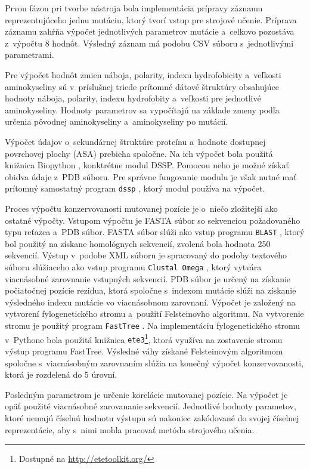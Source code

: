Prvou fázou pri tvorbe nástroja bola implementácia prípravy záznamu reprezentujúceho jednu mutáciu, ktorý tvorí vstup pre strojové učenie. Príprava záznamu zahŕňa výpočet jednotlivých parametrov mutácie a~celkovo pozostáva z~výpočtu 8 hodnôt. Výsledný záznam má podobu CSV súboru s~jednotlivými parametrami.

Pre výpočet hodnôt zmien náboja, polarity, indexu hydrofobicity a~veľkosti aminokyseliny sú v~príslušnej triede prítomné dátové štruktúry obsahujúce hodnoty náboja, polarity, indexu hydrofobity a~veľkosti pre jednotlivé aminokyseliny. Hodnoty parametrov sa vypočítajú na základe zmeny podľa určenia pôvodnej aminokyseliny a~aminokyseliny po mutácií.

Výpočet údajov o~sekundárnej štruktúre proteínu a~hodnote dostupnej povrchovej plochy (ASA) prebieha spoločne. Na ich výpočet bola použitá knižnica Biopython \cite{biopython}, konktrétne modul DSSP. Pomocou neho je možné získať obidva údaje z~PDB súboru. Pre správne fungovanie modulu je však nutné mať prítomný samostatný program {\tt dssp} , ktorý modul používa na výpočet.

Proces výpočtu konzervovanosti mutovanej pozície je o~niečo zložitejší ako ostatné výpočty. Vstupom výpočtu je FASTA súbor so sekvenciou požadovaného typu reťazca a~PDB súbor. FASTA súbor slúži ako vstup programu {\tt BLAST} \cite{blastp}, ktorý bol použitý na získane homológnych sekvencií, zvolená bola hodnota 250 sekvencií. Výstup v~podobe XML súboru je spracovaný do podoby textového súboru slúžiaceho ako vstup programu {\tt Clustal Omega} \cite{clustal}, ktorý vytvára viacnásobné zarovnanie vstupných sekvencií.
PDB súbor je určený na získanie počiatočnej pozície rezidua, ktorá spoločne s~indexom mutácie slúži na získanie výsledného indexu mutácie vo viacnásobnom zarovnaní. Výpočet je založený na vytvorení fylogenetického stromu a~použití Felsteinovho algoritmu. Na vytvorenie stromu je použitý program {\tt FastTree} \cite{fasttree}. Na implementáciu fylogenetického stromu v~Pythone bola použitá knižnica {\tt ete3}\footnote{Dostupné na \url{http://etetoolkit.org/}}, ktorá využíva na zostavenie stromu výstup programu FastTree. Výsledné váhy získané Felsteinovým algoritmom spoločne s~viacnásobným zarovnaním slúžia na konečný výpočet konzervovanosti, ktorá je rozdelená do 5 úrovní.

Posledným parametrom je určenie korelácie mutovanej pozície. Na výpočet je opäť použité viacnásobné zarovananie sekvencií. Jednotlivé hodnoty parametov, ktoré nemajú číselnú hodnotu výstupu sú nakoniec zakódované do svojej číselnej reprezentácie, aby s~nimi mohla pracovať metóda strojového učenia.

